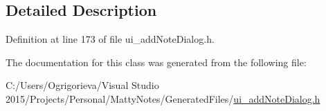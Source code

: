 \subsection{Detailed Description}


Definition at line 173 of file ui\+\_\+add\+Note\+Dialog.\+h.



The documentation for this class was generated from the following file\+:\begin{DoxyCompactItemize}
\item 
C\+:/\+Users/\+Ogrigorieva/\+Visual Studio 2015/\+Projects/\+Personal/\+Matty\+Notes/\+Generated\+Files/\hyperlink{ui__addNoteDialog_8h}{ui\+\_\+add\+Note\+Dialog.\+h}\end{DoxyCompactItemize}
